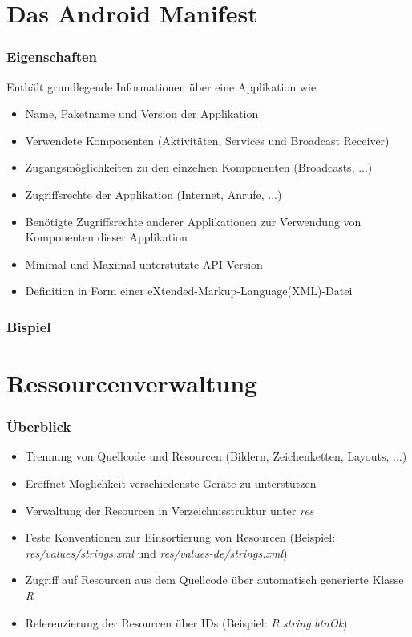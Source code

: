 \section{Das Android Manifest}
\begin{frame}[label=manifest]
   \frametitle{Eigenschaften}
   Enthält grundlegende Informationen über eine Applikation wie
   \begin{itemize}
      \item Name, Paketname und Version der Applikation
      \item Verwendete Komponenten (Aktivitäten, Services und Broadcast Receiver)
      \item Zugangsmöglichkeiten zu den einzelnen Komponenten (Broadcasts, ...)
      \item Zugriffsrechte der Applikation (Internet, Anrufe, ...)
      \item Benötigte Zugriffsrechte anderer Applikationen zur Verwendung 
         von Komponenten dieser Applikation
      \item Minimal und Maximal unterstützte API-Version
      \item Definition in Form einer eXtended-Markup-Language(XML)-Datei
   \end{itemize}
\end{frame}

\begin{frame}[fragile, label=manifest_structure]
   \frametitle{Bispiel}
   
\end{frame}

\section{Ressourcenverwaltung}
\begin{frame}[label=resources]
   \frametitle{Überblick}
   \begin{itemize}
      \item Trennung von Quellcode und Resourcen (Bildern, Zeichenketten, Layouts, ...)
      \item Eröffnet Möglichkeit verschiedenste Geräte zu unterstützen
      \item Verwaltung der Resourcen in Verzeichnisstruktur unter \emph{res}
      \item Feste Konventionen zur Einsortierung von Resourcen 
         (Beispiel: \emph{res/values/strings.xml} und \emph{res/values-de/strings.xml})
      \item Zugriff auf Resourcen aus dem Quellcode über automatisch generierte Klasse \emph{R}
      \item Referenzierung der Resourcen über IDs (Beispiel: \emph{R.string.btnOk})
   \end{itemize}

   
\end{frame}

